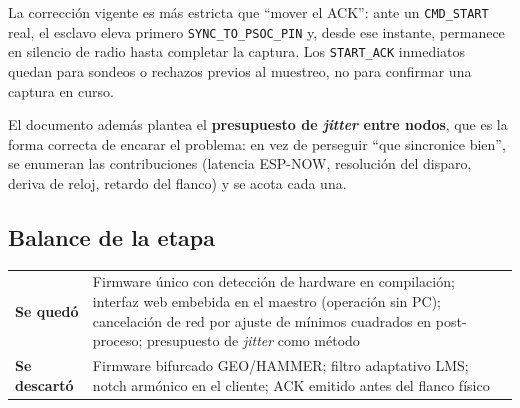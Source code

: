 
La correcci\'on vigente es m\'as estricta que ``mover el ACK'': ante un
\texttt{CMD\_START} real, el esclavo eleva primero
\texttt{SYNC\_TO\_PSOC\_PIN} y, desde ese instante, permanece en silencio de
radio hasta completar la captura. Los \texttt{START\_ACK} inmediatos quedan
para sondeos o rechazos previos al muestreo, no para confirmar una captura en
curso.

El documento adem\'as plantea el \textbf{presupuesto de \emph{jitter} entre
nodos}, que es la forma correcta de encarar el problema: en vez de perseguir
``que sincronice bien'', se enumeran las contribuciones (latencia ESP-NOW,
resoluci\'on del disparo, deriva de reloj, retardo del flanco) y se acota cada
una.


\subsection{Balance de la etapa}

\begin{center}\small
\begin{tabularx}{\textwidth}{@{}l X@{}}
\toprule
\textbf{Se qued\'o} & Firmware \'unico con detecci\'on de hardware en compilaci\'on; interfaz web embebida en el maestro (operaci\'on sin PC); cancelaci\'on de red por ajuste de m\'inimos cuadrados en post-proceso; presupuesto de \emph{jitter} como m\'etodo \\
\addlinespace[3pt]
\textbf{Se descart\'o} & Firmware bifurcado GEO/HAMMER; filtro adaptativo LMS; notch arm\'onico en el cliente; ACK emitido antes del flanco f\'isico \\
\bottomrule
\end{tabularx}
\end{center}
